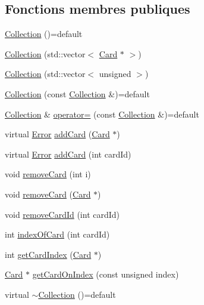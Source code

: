 \subsection*{Fonctions membres publiques}
\begin{DoxyCompactItemize}
\item 
\hyperlink{classCollection_a5a47d67f2f24553ea9adde4f4f286dc6}{Collection} ()=default
\item 
\hyperlink{classCollection_ab635b340b56740374abd52368087be0b}{Collection} (std\+::vector$<$ \hyperlink{classCard}{Card} $\ast$ $>$)
\item 
\hyperlink{classCollection_a68b48e6494b0a52b1c873c5fd8420007}{Collection} (std\+::vector$<$ unsigned $>$)
\item 
\hyperlink{classCollection_ac6947d19970d090b545eef22c101087d}{Collection} (const \hyperlink{classCollection}{Collection} \&)=default
\item 
\hyperlink{classCollection}{Collection} \& \hyperlink{classCollection_afdc6e54deac9226fda136ca4bb8a97a1}{operator=} (const \hyperlink{classCollection}{Collection} \&)=default
\item 
virtual \hyperlink{Error_8hpp_a2c3e4bb40f36b262a5214e2da2bca9c5}{Error} \hyperlink{classCollection_a430b67b03697286c696b9972de4b7b4b}{add\+Card} (\hyperlink{classCard}{Card} $\ast$)
\item 
virtual \hyperlink{Error_8hpp_a2c3e4bb40f36b262a5214e2da2bca9c5}{Error} \hyperlink{classCollection_a580daf9636192634d949951ceffba096}{add\+Card} (int card\+Id)
\item 
void \hyperlink{classCollection_ae7ee9c1b7e8619d2cf851e5c0dbd81b6}{remove\+Card} (int i)
\item 
void \hyperlink{classCollection_a2020d4aef89fd4c70141ce2e2d061ae9}{remove\+Card} (\hyperlink{classCard}{Card} $\ast$)
\item 
void \hyperlink{classCollection_a633b047916ca73598b08c019ffe6c4a5}{remove\+Card\+Id} (int card\+Id)
\item 
int \hyperlink{classCollection_a9bd74b104abcc47257564044be71a6b2}{index\+Of\+Card} (int card\+Id)
\item 
int \hyperlink{classCollection_aa7acabbd00d04898ffefce407645142e}{get\+Card\+Index} (\hyperlink{classCard}{Card} $\ast$)
\item 
\hyperlink{classCard}{Card} $\ast$ \hyperlink{classCollection_aced95e3b1de7bebeb22d9cb1d36d483b}{get\+Card\+On\+Index} (const unsigned index)
\item 
virtual \hyperlink{classCollection_ac7fe8e15953eee4ba235ee7ebc4ffc5b}{$\sim$\+Collection} ()=default
\end{DoxyCompactItemize}
